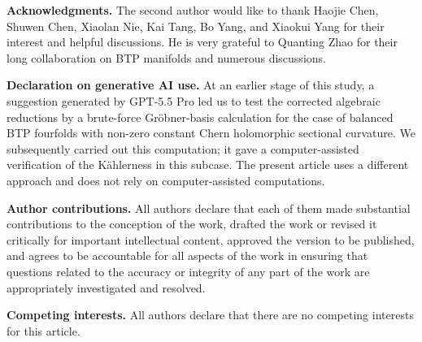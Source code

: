 \documentclass{amsart}
\begin{document}
\vspace{0.3cm}

\noindent\textbf{Acknowledgments.}
The second author would like to thank Haojie Chen, Shuwen Chen, Xiaolan Nie, Kai Tang, Bo Yang, and Xiaokui Yang for their interest and helpful discussions. He is very grateful to Quanting Zhao for their long collaboration on BTP manifolds and numerous discussions.


\vspace{0.3cm}

\noindent\textbf{Declaration on generative AI use.}
At an earlier stage of this study, a suggestion generated by GPT-5.5 Pro \cite{OpenAIGPT55Pro} led us to test the corrected algebraic reductions by a brute-force Gr\"obner-basis calculation for the case of balanced BTP fourfolds with non-zero constant Chern holomorphic sectional curvature. We subsequently carried out this computation; it gave a computer-assisted verification of the K\"ahlerness in this subcase. The present article uses a different approach and does not rely on computer-assisted computations.

\vspace{0.3cm}


\noindent\textbf{Author contributions.}
All authors declare that each of them made substantial contributions to the conception of the work, drafted the work or revised it critically for important intellectual content, approved the version to be published, and agrees to be accountable for all aspects of the work in ensuring that questions related to the accuracy or integrity of any part of the work are appropriately investigated and resolved.

\vspace{0.3cm}

\noindent\textbf{Competing interests.}
All authors declare that there are no competing interests for this article.


\vspace{0.3cm}
\end{document}
